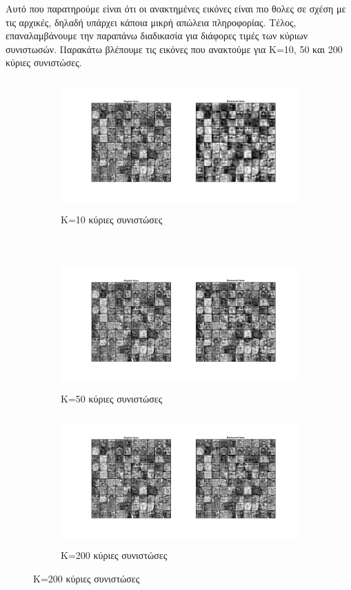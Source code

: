 \documentclass{article}
\begin{document}
 	\noindent
 	Aυτό που παρατηρούμε είναι ότι οι ανακτημένες εικόνες είναι πιο θολες σε σχέση με τις αρχικές, δηλαδή υπάρχει κάποια μικρή απώλεια πληροφορίας. Tέλος, επαναλαμβάνουμε την παραπάνω διαδικασία για διάφορες τιμές των κύριων συνιστωσών. Παρακάτω βλέπουμε τις εικόνες που ανακτούμε για K=10, 50 και 200 κύριες συνιστώσες.
 	
 	\begin{figure}[h!]
 		\centering
 		\begin{subfigure}[t]{0.5\textwidth}
 			\centering
 			\includegraphics[height=5cm, width=\linewidth]{../exercise1_1/images/faces_K_10.png}
 			\caption{K=10 κύριες συνιστώσες}
 		\end{subfigure}%
 		~
 		\begin{subfigure}[t]{0.5\textwidth}
 			\centering
 			\includegraphics[height=5cm, width=\linewidth]{../exercise1_1/images/faces_K_50.png}
 			\caption{K=50 κύριες συνιστώσες}
 		\end{subfigure}
 	
 		\begin{subfigure}[t]{0.5\textwidth}
 			\centering
 			\includegraphics[height=5cm, width=\linewidth]{../exercise1_1/images/faces_K_200.png}
 			\caption{K=200 κύριες συνιστώσες}
 		\end{subfigure}
 	\end{figure}
 	
\end{document}
